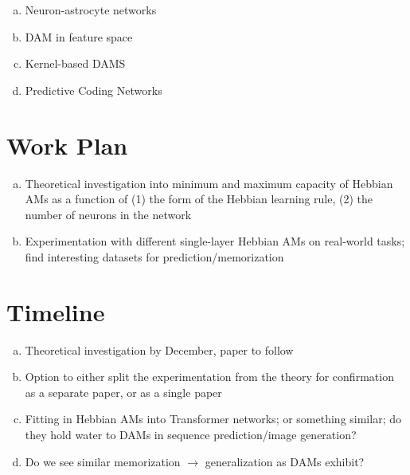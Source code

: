\documentclass{article}
\theoremstyle{definition}
\begin{document}
\begin{enumerate}[(a)]
    \item Neuron-astrocyte networks
    \item DAM in feature space
    \item Kernel-based DAMS
    \item Predictive Coding Networks
\end{enumerate}

\section{Work Plan}

\begin{enumerate}[(a)]
    \item Theoretical investigation into minimum and maximum capacity of Hebbian AMs 
    as a function of (1) the form of the Hebbian learning rule, (2) the number of neurons in the network
    \item Experimentation with different single-layer Hebbian AMs on real-world tasks; 
    find interesting datasets for prediction/memorization
\end{enumerate}

\section{Timeline}

\begin{enumerate}[(a)]
    \item Theoretical investigation by December, paper to follow
    \item Option to either split the experimentation from the theory for confirmation as a separate
    paper, or as a single paper
    \item Fitting in Hebbian AMs into Transformer networks; or something similar; do they hold
    water to DAMs in sequence prediction/image generation?
    \item Do we see similar memorization $\to$ generalization as DAMs exhibit?
\end{enumerate}

\printbibliography
\end{document}
